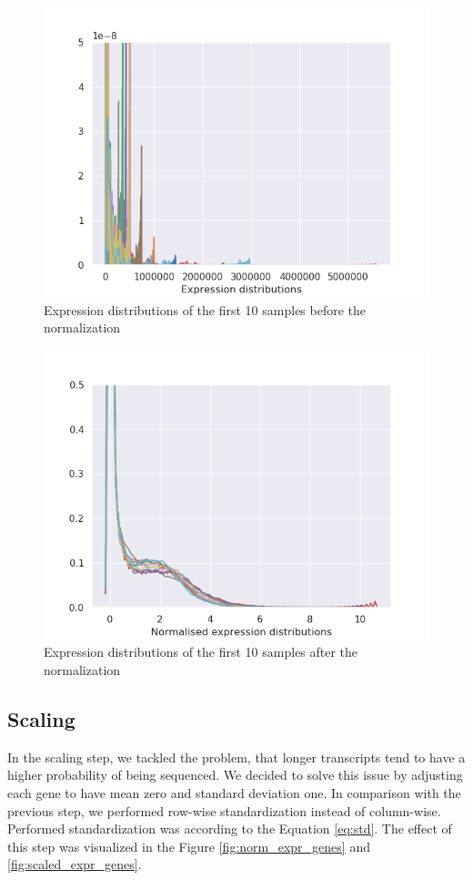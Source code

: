 \begin{figure}
    \centering
    \includegraphics[width=0.8\linewidth]{images/expr_dist.png}
    \caption[Expression before normalization]{Expression distributions of the first 10 samples before the normalization}
    \label{fig:expr_dist}
\end{figure}

\begin{figure}
    \centering
    \includegraphics[width=0.8\linewidth]{images/norm_expr_dist.png}
    \caption[Expression after normalization]{Expression distributions of the first 10 samples after the normalization}
    \label{fig:norm_expr_dist}
\end{figure}

\subsection{Scaling}
In the scaling step, we tackled the problem, that longer transcripts tend to have a higher probability of being sequenced.
We decided to solve this issue by adjusting each gene to have mean zero and standard deviation one.
In comparison with the previous step, we performed row-wise standardization instead of column-wise.
Performed standardization was according to the Equation \ref{eq:std}.
The effect of this step was visualized in the Figure \ref{fig:norm_expr_genes} and \ref{fig:scaled_expr_genes}.

